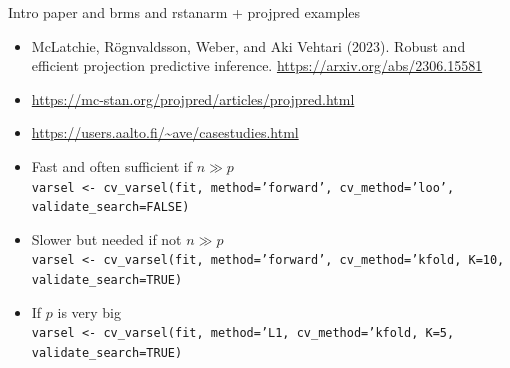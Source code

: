 \documentclass[t]{beamer}
\begin{document}

\begin{frame}{Intro paper and brms and rstanarm + projpred examples}

\begin{itemize}
\item {\footnotesize McLatchie, Rögnvaldsson, Weber, and Aki Vehtari (2023). Robust and efficient projection predictive inference. \url{https://arxiv.org/abs/2306.15581}}
\item \url{https://mc-stan.org/projpred/articles/projpred.html}
\item \url{https://users.aalto.fi/~ave/casestudies.html}
\item Fast and often sufficient if $n\gg p$\\
  {\footnotesize \texttt{varsel <- cv\_varsel(fit, method='forward', cv\_method='loo', validate\_search=FALSE)}}
\item Slower but needed if not $n\gg p$\\
  {\footnotesize \texttt{varsel <- cv\_varsel(fit, method='forward', cv\_method='kfold, K=10, validate\_search=TRUE)}}
\item If $p$ is very big\\
  {\footnotesize \texttt{varsel <- cv\_varsel(fit, method='L1, cv\_method='kfold, K=5, validate\_search=TRUE)}}
\end{itemize}

\end{frame}

  
  
\end{document}

